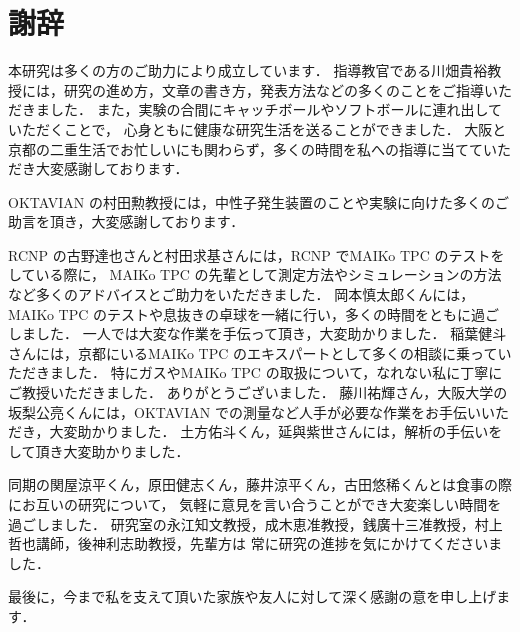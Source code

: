 \documentclass[../master]{subfiles}
\begin{document}
\chapter*{謝辞}
本研究は多くの方のご助力により成立しています．
指導教官である川畑貴裕教授には，研究の進め方，文章の書き方，発表方法などの多くのことをご指導いただきました．
また，実験の合間にキャッチボールやソフトボールに連れ出していただくことで，
心身ともに健康な研究生活を送ることができました．
大阪と京都の二重生活でお忙しいにも関わらず，多くの時間を私への指導に当てていただき大変感謝しております．

OKTAVIAN の村田勲教授には，中性子発生装置のことや実験に向けた多くのご助言を頂き，大変感謝しております．

RCNP の古野達也さんと村田求基さんには，RCNP でMAIKo TPC のテストをしている際に，
MAIKo TPC の先輩として測定方法やシミュレーションの方法など多くのアドバイスとご助力をいただきました．
岡本慎太郎くんには，MAIKo TPC のテストや息抜きの卓球を一緒に行い，多くの時間をともに過ごしました．
一人では大変な作業を手伝って頂き，大変助かりました．
稲葉健斗さんには，京都にいるMAIKo TPC のエキスパートとして多くの相談に乗っていただきました．
特にガスやMAIKo TPC の取扱について，なれない私に丁寧にご教授いただきました．
ありがとうございました．
藤川祐輝さん，大阪大学の坂梨公亮くんには，OKTAVIAN での測量など人手が必要な作業をお手伝いいただき，大変助かりました．
土方佑斗くん，延與紫世さんには，解析の手伝いをして頂き大変助かりました．

同期の関屋涼平くん，原田健志くん，藤井涼平くん，古田悠稀くんとは食事の際にお互いの研究について，
気軽に意見を言い合うことができ大変楽しい時間を過ごしました．
研究室の永江知文教授，成木恵准教授，銭廣十三准教授，村上哲也講師，後神利志助教授，先輩方は
常に研究の進捗を気にかけてくださいました．

最後に，今まで私を支えて頂いた家族や友人に対して深く感謝の意を申し上げます．
\end{document}
